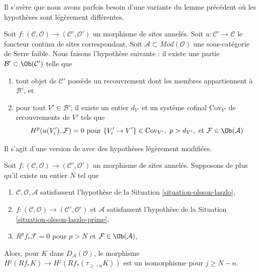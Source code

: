 \noindent
Il s'avère que nous avons parfois besoin d'une variante du lemme précédent
où les hypothèses sont légèrement différentes.

\begin{situation}
\label{situation-olsson-laszlo-prime}
Soit
$f : (\mathcal{C}, \mathcal{O}) \to (\mathcal{C}', \mathcal{O}')$
un morphisme de sites annelés. Soit $u : \mathcal{C}' \to \mathcal{C}$ le
foncteur continu de sites correspondant. Soit
$\mathcal{A} \subset \textit{Mod}(\mathcal{O})$ une sous-catégorie de Serre
faible. Nous faisons l'hypothèse suivante : il existe une partie
$\mathcal{B}' \subset \Ob(\mathcal{C}')$ telle que
\begin{enumerate}
\item tout objet de $\mathcal{C}'$ possède un recouvrement dont les membres
appartiennent à $\mathcal{B}'$, et
\item pour tout $V' \in \mathcal{B}'$, il existe un entier $d_{V'}$ et un
système cofinal $\text{Cov}_{V'}$ de recouvrements de $V'$ tels que
$$
H^p(u(V'_i), \mathcal{F}) = 0 \text{ pour }
\{V'_i \to V'\} \in \text{Cov}_{V'},\ p > d_{V'}, \text{ et }
\mathcal{F} \in \Ob(\mathcal{A})
$$
\end{enumerate}
\end{situation}

\begin{lemma}
\label{lemma-olsson-laszlo-map-version-two}
\begin{reference}
Il s'agit d'une version de \cite[Lemma 2.1.10]{six-I} avec des hypothèses
légèrement modifiées.
\end{reference}
Soit $f : (\mathcal{C}, \mathcal{O}) \to (\mathcal{C}', \mathcal{O}')$ un
morphisme de sites annelés. Supposons de plus qu'il existe un entier $N$
tel que
\begin{enumerate}
\item $\mathcal{C}, \mathcal{O}, \mathcal{A}$ satisfassent l'hypothèse de
la Situation \ref{situation-olsson-laszlo},
\item $f : (\mathcal{C}, \mathcal{O}) \to (\mathcal{C}', \mathcal{O}')$
et $\mathcal{A}$ satisfassent l'hypothèse de la Situation
\ref{situation-olsson-laszlo-prime},
\item $R^pf_*\mathcal{F} = 0$ pour
$p > N$ et $\mathcal{F} \in \Ob(\mathcal{A})$,
\end{enumerate}
Alors, pour $K$ dans $D_\mathcal{A}(\mathcal{O})$, le morphisme
$H^j(Rf_*K) \to H^j(Rf_*(\tau_{\geq -n}K))$ est un isomorphisme pour
$j \geq N - n$.
\end{lemma}

